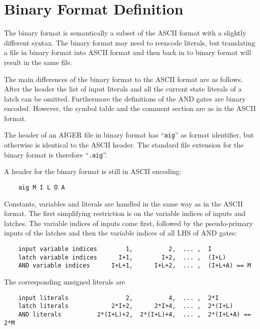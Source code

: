 \documentclass[10pt]{llncs}
\begin{document}
\section{Binary Format Definition}

  The binary format is semantically a subset of the ASCII format with a
  slightly different syntax.  The binary format may need to reencode
  literals, but translating a file in binary format into ASCII format and
  then back in to binary format will result in the same file.

  The main differences of the binary format to the ASCII format are as
  follows.  After the header the list of input literals and all the
  current state literals of a latch can be omitted.  Furthermore the
  definitions of the AND gates are binary encoded.  However, the symbol
  table and the comment section are as in the ASCII format.

  The header of an AIGER file in binary format has ``\texttt{aig}'' as format
  identifier, but otherwise is identical to the ASCII header.  The standard
  file extension for the binary format is therefore ``\texttt{.aig}''. 
  
  A header for the binary format is still in ASCII encoding:

\begin{verbatim}
    aig M I L O A
\end{verbatim}

  Constants, variables and literals are handled in the same way as in the
  ASCII format.  The first simplifying restriction is on the variable
  indices of inputs and latches.  The variable indices of inputs come first,
  followed by the pseudo-primary inputs of the latches and then the variable
  indices of all LHS of AND gates:

\begin{verbatim}
    input variable indices        1,          2,  ... ,  I
    latch variable indices      I+1,        I+2,  ... ,  (I+L)
    AND variable indices      I+L+1,      I+L+2,  ... ,  (I+L+A) == M
\end{verbatim}

  The corresponding unsigned literals are

\begin{verbatim}
    input literals                2,          4,  ... ,  2*I
    latch literals            2*I+2,      2*I+4,  ... ,  2*(I+L)
    AND literals          2*(I+L)+2,  2*(I+L)+4,  ... ,  2*(I+L+A) == 2*M
\end{verbatim}
                    
\end{document}
